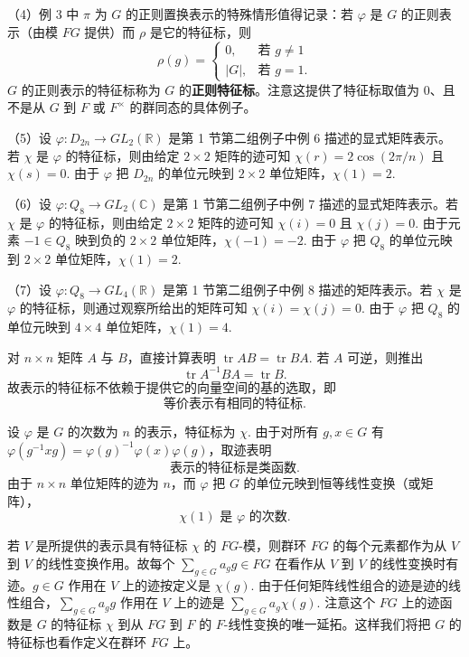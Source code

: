 （4）例 3 中 \(\pi\) 为 \(G\) 的正则置换表示的特殊情形值得记录：若 \(\varphi\) 是 \(G\) 的正则表示（由模 \(FG\) 提供）而 \(\rho\) 是它的特征标，则
\[
\rho(g) = \begin{cases}0, & \text{若 } g \neq 1\\ |G|, & \text{若 } g = 1.\end{cases}
\]
\(G\) 的正则表示的特征标称为 \(G\) 的\textbf{正则特征标}。注意这提供了特征标取值为 0、且不是从 \(G\) 到 \(F\) 或 \(F^\times\) 的群同态的具体例子。

（5）设 \(\varphi : D_{2n} \to GL_2(\mathbb{R})\) 是第 1 节第二组例子中例 6 描述的显式矩阵表示。若 \(\chi\) 是 \(\varphi\) 的特征标，则由给定 \(2 \times 2\) 矩阵的迹可知 \(\chi(r) = 2\cos(2\pi/n)\) 且 \(\chi(s) = 0\). 由于 \(\varphi\) 把 \(D_{2n}\) 的单位元映到 \(2 \times 2\) 单位矩阵，\(\chi(1) = 2\).

（6）设 \(\varphi : Q_8 \to GL_2(\mathbb{C})\) 是第 1 节第二组例子中例 7 描述的显式矩阵表示。若 \(\chi\) 是 \(\varphi\) 的特征标，则由给定 \(2 \times 2\) 矩阵的迹可知 \(\chi(i) = 0\) 且 \(\chi(j) = 0\). 由于元素 \(-1 \in Q_8\) 映到负的 \(2 \times 2\) 单位矩阵，\(\chi(-1) = -2\). 由于 \(\varphi\) 把 \(Q_8\) 的单位元映到 \(2 \times 2\) 单位矩阵，\(\chi(1) = 2\).

（7）设 \(\varphi : Q_8 \to GL_4(\mathbb{R})\) 是第 1 节第二组例子中例 8 描述的矩阵表示。若 \(\chi\) 是 \(\varphi\) 的特征标，则通过观察所给出的矩阵可知 \(\chi(i) = \chi(j) = 0\). 由于 \(\varphi\) 把 \(Q_8\) 的单位元映到 \(4 \times 4\) 单位矩阵，\(\chi(1) = 4\).

对 \(n \times n\) 矩阵 \(A\) 与 \(B\)，直接计算表明 \(\operatorname{tr}AB = \operatorname{tr}BA\). 若 \(A\) 可逆，则推出
\[
\operatorname{tr}A^{-1}BA = \operatorname{tr}B.
\]
故表示的特征标不依赖于提供它的向量空间的基的选取，即
\[
\text{等价表示有相同的特征标}. \tag{18.1}
\]

设 \(\varphi\) 是 \(G\) 的次数为 \(n\) 的表示，特征标为 \(\chi\). 由于对所有 \(g, x \in G\) 有 \(\varphi(g^{-1}xg) = \varphi(g)^{-1}\varphi(x)\varphi(g)\)，取迹表明
\[
\text{表示的特征标是类函数}. \tag{18.2}
\]
由于 \(n \times n\) 单位矩阵的迹为 \(n\)，而 \(\varphi\) 把 \(G\) 的单位元映到恒等线性变换（或矩阵），
\[
\chi(1) \text{ 是 } \varphi \text{ 的次数}. \tag{18.3}
\]

若 \(V\) 是所提供的表示具有特征标 \(\chi\) 的 \(FG\)-模，则群环 \(FG\) 的每个元素都作为从 \(V\) 到 \(V\) 的线性变换作用。故每个 \(\sum_{g \in G}a_gg \in FG\) 在看作从 \(V\) 到 \(V\) 的线性变换时有迹。\(g \in G\) 作用在 \(V\) 上的迹按定义是 \(\chi(g)\). 由于任何矩阵线性组合的迹是迹的线性组合，\(\sum_{g \in G}a_gg\) 作用在 \(V\) 上的迹是 \(\sum_{g \in G}a_g\chi(g)\). 注意这个 \(FG\) 上的迹函数是 \(G\) 的特征标 \(\chi\) 到从 \(FG\) 到 \(F\) 的 \(F\)-线性变换的唯一延拓。这样我们将把 \(G\) 的特征标也看作定义在群环 \(FG\) 上。

